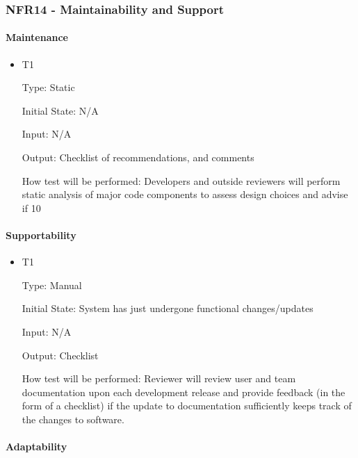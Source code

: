 \documentclass[12pt, titlepage]{article}
\begin{document}
\subsubsection{NFR14 - Maintainability and Support}

\paragraph{Maintenance}

\begin{itemize}

\item{T1\\}

Type: Static

Initial State: N/A

Input: N/A

Output: Checklist of recommendations, and comments

How test will be performed: Developers and outside reviewers will perform static analysis of major code components to assess design choices and advise if 10%

\end{itemize}

\paragraph{Supportability}

\begin{itemize}

\item{T1\\}

Type: Manual

Initial State: System has just undergone functional changes/updates

Input: N/A

Output: Checklist

How test will be performed: Reviewer will review user and team documentation upon each development release and provide feedback (in the form of a checklist) if the update to documentation sufficiently keeps track of the changes to software.

\end{itemize}

\paragraph{Adaptability}
\end{document}

